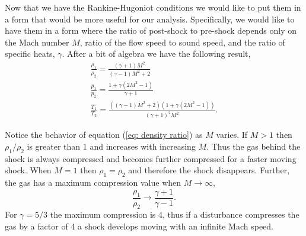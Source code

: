 \documentclass{article}
\begin{document}
Now that we have the Rankine-Hugoniot conditions we would like to put them in a form that would be more useful for our analysis. Specifically, we would like to have them in a form where the ratio of post-shock to pre-shock depends only on the Mach number $M$, ratio of the flow speed to sound speed, and the ratio of specific heats, $\gamma$. After a bit of algebra we have the following result,
\begin{gather}
\label{eq: density ratio}
\frac{\rho_1}{\rho_2}  = \frac{\left(\gamma+1\right)M^2}{\left(\gamma-1\right)M^2+2}\\
\label{eq: momentum ratio}
\frac{p_1}{p_2} = \frac{1+\gamma\left(2 M^2-1\right)}{\gamma+1}\\
\label{eq: temperature ratio}
\frac{T_1}{T_2} = \frac{\left(\left(\gamma-1\right)M^2+2\right)\left(1+\gamma\left(2M^2-1\right)\right)}{\left(\gamma+1\right)^2M^2}.
\end{gather}

Notice the behavior of equation (\ref{eq: density ratio}) as $M$ varies. If $M >1$ then $\rho_1/\rho_2$ is greater than 1 and increases with increasing $M$. Thus the gas behind the shock is always compressed and becomes further compressed for a faster moving shock. When $M = 1$ then $\rho_1 = \rho_2$ and therefore the shock disappears. Further, the gas has a maximum compression value when $M\rightarrow\infty$,
\begin{equation}
\label{eq: density ratio limit}
\frac{\rho_1}{\rho_2} \rightarrow \frac{\gamma + 1}{\gamma - 1}.
\end{equation}
For $\gamma = 5/3$ the maximum compression is 4, thus if a disturbance compresses the gas by a factor of 4 a shock develops moving with an infinite Mach speed.
\end{document}
